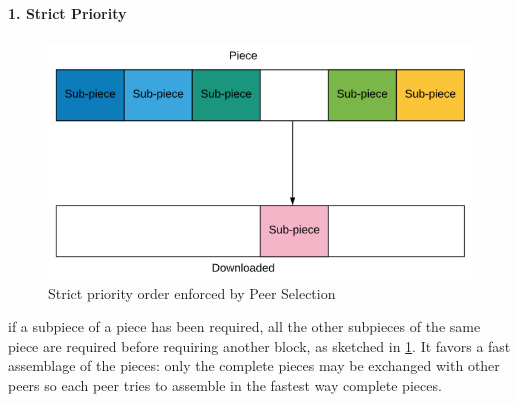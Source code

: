 \documentclass[10pt,a4paper]{report}
\begin{document}
\paragraph{1. Strict Priority}\label{sec:1-strict-priority}
\begin{figure}[h!]
	\centering
	\includegraphics[scale=0.50]{images/Pasted image 20230311101310.png}
	\caption{Strict priority order enforced by Peer Selection}
	\label{strict-priority}
\end{figure}

if a subpiece of a piece has been required, all the other subpieces of the same piece are required before requiring another block, as sketched in \ref{strict-priority}. It favors a fast assemblage of the pieces: only the complete pieces may be exchanged with other peers so each peer tries to assemble in the fastest way complete pieces.
\end{document}
